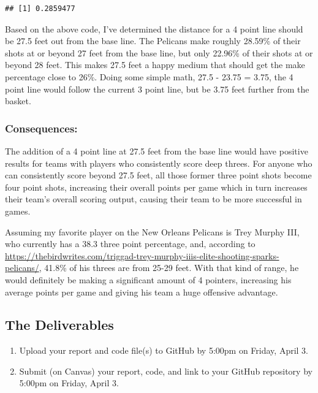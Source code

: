 \documentclass[
]{article}
\providecommand{\tightlist}{%
  \setlength{\itemsep}{0pt}\setlength{\parskip}{0pt}}
\begin{document}
\begin{verbatim}
## [1] 0.2859477
\end{verbatim}

Based on the above code, I've determined the distance for a 4 point line
should be 27.5 feet out from the base line. The Pelicans make roughly
28.59\% of their shots at or beyond 27 feet from the base line, but only
22.96\% of their shots at or beyond 28 feet. This makes 27.5 feet a
happy medium that should get the make percentage close to 26\%. Doing
some simple math, 27.5 - 23.75 = 3.75, the 4 point line would follow the
current 3 point line, but be 3.75 feet further from the basket.

\subsubsection{Consequences:}\label{consequences}

The addition of a 4 point line at 27.5 feet from the base line would
have positive results for teams with players who consistently score deep
threes. For anyone who can consistently score beyond 27.5 feet, all
those former three point shots become four point shots, increasing their
overall points per game which in turn increases their team's overall
scoring output, causing their team to be more successful in games.

Assuming my favorite player on the New Orleans Pelicans is Trey Murphy
III, who currently has a 38.3 three point percentage, and, according to
\url{https://thebirdwrites.com/triggad-trey-murphy-iiis-elite-shooting-sparks-pelicans/},
41.8\% of his threes are from 25-29 feet. With that kind of range, he
would definitely be making a significant amount of 4 pointers,
increasing his average points per game and giving his team a huge
offensive advantage.

\subsection{The Deliverables}\label{the-deliverables}

\begin{enumerate}
\def\labelenumi{\arabic{enumi}.}
\tightlist
\item
  Upload your report and code file(s) to GitHub by 5:00pm on Friday,
  April 3.
\item
  Submit (on Canvas) your report, code, and link to your GitHub
  repository by 5:00pm on Friday, April 3.
\end{enumerate}
\end{document}

